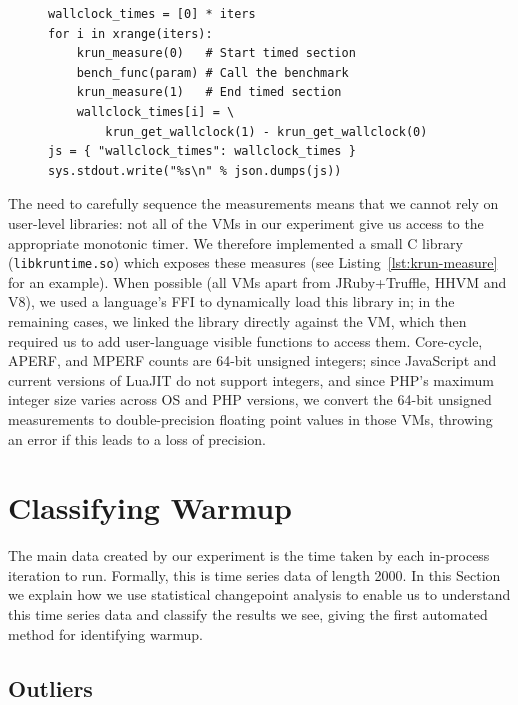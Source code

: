 \documentclass[preprint,numbers,10pt]{sigplanconf}
\begin{document}
\begin{figure}[t]
\begin{lstlisting}[label=lst:pyiter, caption={An elided version of the Python
in-process iterations runner (with core cycles etc. removed).}]
wallclock_times = [0] * iters
for i in xrange(iters):
    krun_measure(0)   # Start timed section
    bench_func(param) # Call the benchmark
    krun_measure(1)   # End timed section
    wallclock_times[i] = \
        krun_get_wallclock(1) - krun_get_wallclock(0)
js = { "wallclock_times": wallclock_times }
sys.stdout.write("%s\n" % json.dumps(js))
\end{lstlisting}
\end{figure}

The need to carefully sequence the measurements means that we cannot rely
on user-level libraries: not all of the VMs in our experiment give us access to
the appropriate monotonic timer. We therefore
implemented a small C library (\texttt{libkruntime.so}) which exposes these
measures (see Listing~\ref{lst:krun-measure} for an example). When possible
(all VMs apart from JRuby+Truffle, HHVM and V8), we used a language's FFI to dynamically load this library
in; in the remaining cases, we linked the library directly against the VM, which
then required us to add user-language visible functions to access them.
Core-cycle, APERF, and MPERF counts are 64-bit unsigned integers; since
JavaScript and current versions of LuaJIT do not support
integers, and since PHP's maximum integer size varies across OS and PHP versions, we
convert the 64-bit unsigned measurements to
double-precision floating point values in those VMs, throwing an error if this leads to a
loss of precision.


\section{Classifying Warmup}
\label{sec:stats}

The main data created by our experiment is the time taken by each in-process
iteration to run. Formally, this is time series data of length 2000. In
this Section we explain how we use statistical changepoint analysis to enable us to
understand this time series data and classify the results we see, giving the
first automated method for identifying warmup.


\subsection{Outliers}
\end{document}
